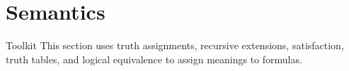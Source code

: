 \section{Semantics}

\begin{toolkitbox}{Toolkit}
This section uses truth assignments, recursive extensions, satisfaction,
truth tables, and logical equivalence to assign meanings to formulas.
\end{toolkitbox}




